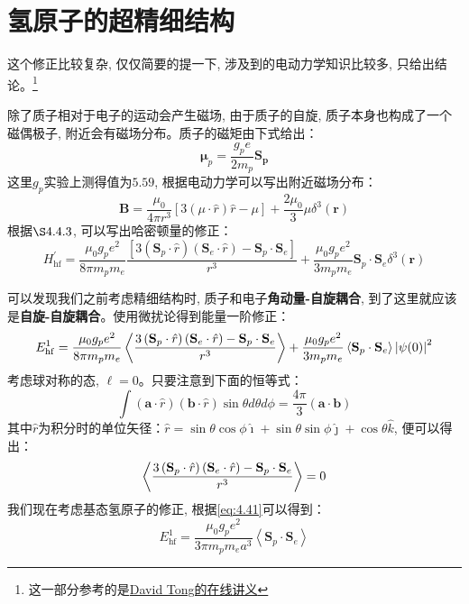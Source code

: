 \documentclass[a4paper,zihao=-4,linespread=1]{ctexrep}
\begin{document}
    \section{氢原子的超精细结构}
    这个修正比较复杂, 仅仅简要的提一下, 涉及到的电动力学知识比较多, 只给出结论。\footnote{这一部分参考的是\href{http://www.damtp.cam.ac.uk/user/tong/topicsinqm.html}{David Tong的在线讲义}}

    除了质子相对于电子的运动会产生磁场, 由于质子的自旋, 质子本身也构成了一个磁偶极子, 附近会有磁场分布。质子的磁矩由下式给出：
    $$\mathbf{\mu}_p=\frac{g_p e}{2m_p}\mathbf{S_p}$$
    这里$g_p$实验上测得值为$5.59$, 根据电动力学可以写出附近磁场分布：
    \begin{equation}
        \mathbf{B}=\frac{\mu_0}{4 \pi r^3}[3(\mu \cdot \hat{r}) \hat{r}-\mu]+\frac{2 \mu_0}{3} \mu \delta^3(\mathbf{r})
    \end{equation}
    根据$\S4.4.3$, 可以写出哈密顿量的修正：
    \begin{equation}
        H_{\mathrm{hf}}^{\prime}=\frac{\mu_0 g_p e^2}{8 \pi m_p m_e} \frac{\left[3\left(\mathbf{S}_p \cdot \hat{r}\right)\left(\mathbf{S}_e \cdot \hat{r}\right)-\mathbf{S}_p \cdot \mathbf{S}_e\right]}{r^3}+\frac{\mu_0 g_p e^2}{3 m_p m_e} \mathbf{S}_p \cdot \mathbf{S}_e \delta^3(\mathbf{r})
    \end{equation}
    
    可以发现我们之前考虑精细结构时, 质子和电子\textbf{角动量-自旋耦合}, 到了这里就应该是\textbf{自旋-自旋耦合}。使用微扰论得到能量一阶修正：
    \begin{equation}
        E^1_{\mathrm{hf}}=\frac{\mu_0 g_p e^2}{8 \pi m_p m_e} \Braket{\frac{3\left(\mathbf{S}_p \cdot \hat{r}\right)\left(\mathbf{S}_e \cdot \hat{r}\right)-\mathbf{S}_p \cdot \mathbf{S}_e}{r^3}}+\frac{\mu_0 g_p e^2}{3 m_p m_e} \Braket{\mathbf{S}_p \cdot \mathbf{S}_e} \left|\psi(0)\right|^2
    \end{equation}
    考虑球对称的态, $\ell=0$。只要注意到下面的恒等式：
    \begin{equation}
        \int(\mathbf{a} \cdot \hat{r})(\mathbf{b} \cdot \hat{r}) \sin \theta d \theta d \phi=\frac{4 \pi}{3}(\mathbf{a} \cdot \mathbf{b})
    \end{equation}
    其中$\hat{r}$为积分时的单位矢径：$\hat{r}=\sin \theta \cos \phi \hat{\imath}+\sin \theta \sin \phi \hat{\jmath}+\cos \theta \hat{k}$, 便可以得出：
    $$\Braket{\frac{3\left(\mathbf{S}_p \cdot \hat{r}\right)\left(\mathbf{S}_e \cdot \hat{r}\right)-\mathbf{S}_p \cdot \mathbf{S}_e}{r^3}}=0$$
    我们现在考虑基态氢原子的修正, 根据\ref{eq:4.41}可以得到：
    \begin{equation}
        E_{\mathrm{hf}}^{1}=\frac{\mu_{0} g_{p} e^{2}}{3 \pi m_{p} m_{e} a^{3}}\left\langle\mathbf{S}_{p} \cdot \mathbf{S}_{e}\right\rangle
    \end{equation}
    
\end{document}
